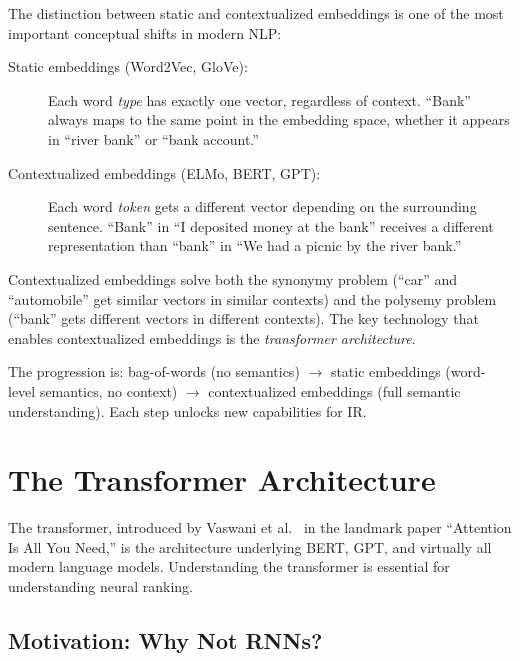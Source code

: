 \documentclass[11pt,a4paper]{article}
\theoremstyle{definition}
\theoremstyle{plain}
\begin{document}
The distinction between static and contextualized embeddings is one of the most important conceptual shifts in modern NLP:

\begin{description}
    \item[Static embeddings (Word2Vec, GloVe):] Each word \emph{type} has exactly one vector, regardless of context. ``Bank'' always maps to the same point in the embedding space, whether it appears in ``river bank'' or ``bank account.''
    
    \item[Contextualized embeddings (ELMo, BERT, GPT):] Each word \emph{token} gets a different vector depending on the surrounding sentence. ``Bank'' in ``I deposited money at the bank'' receives a different representation than ``bank'' in ``We had a picnic by the river bank.''
\end{description}

Contextualized embeddings solve both the synonymy problem (``car'' and ``automobile'' get similar vectors in similar contexts) and the polysemy problem (``bank'' gets different vectors in different contexts). The key technology that enables contextualized embeddings is the \emph{transformer architecture}.

\begin{keytakeaway}
The progression is: bag-of-words (no semantics) $\to$ static embeddings (word-level semantics, no context) $\to$ contextualized embeddings (full semantic understanding). Each step unlocks new capabilities for IR.
\end{keytakeaway}


\section{The Transformer Architecture}
\label{sec:transformers}

The transformer, introduced by Vaswani et al.~\cite{vaswani2017attention} in the landmark paper ``Attention Is All You Need,'' is the architecture underlying BERT, GPT, and virtually all modern language models. Understanding the transformer is essential for understanding neural ranking.

\subsection{Motivation: Why Not RNNs?}
\end{document}
